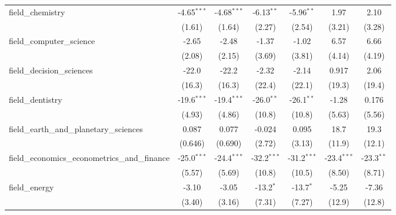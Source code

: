 \begin{tabular}{lcccccc}
   field\_chemistry                                            & -4.65$^{***}$  & -4.68$^{***}$  & -6.13$^{**}$  & -5.96$^{**}$  & 1.97           & 2.10\\   
                                                               & (1.61)         & (1.64)         & (2.27)        & (2.54)        & (3.21)         & (3.28)\\   
   field\_computer\_science                                    & -2.65          & -2.48          & -1.37         & -1.02         & 6.57           & 6.66\\   
                                                               & (2.08)         & (2.15)         & (3.69)        & (3.81)        & (4.14)         & (4.19)\\   
   field\_decision\_sciences                                   & -22.0          & -22.2          & -2.32         & -2.14         & 0.917          & 2.06\\   
                                                               & (16.3)         & (16.3)         & (22.4)        & (22.1)        & (19.3)         & (19.4)\\   
   field\_dentistry                                            & -19.6$^{***}$  & -19.4$^{***}$  & -26.0$^{**}$  & -26.1$^{**}$  & -1.28          & 0.176\\   
                                                               & (4.93)         & (4.86)         & (10.8)        & (10.8)        & (5.63)         & (5.56)\\   
   field\_earth\_and\_planetary\_sciences                      & 0.087          & 0.077          & -0.024        & 0.095         & 18.7           & 19.3\\   
                                                               & (0.646)        & (0.690)        & (2.72)        & (3.13)        & (11.9)         & (12.1)\\   
   field\_economics\_econometrics\_and\_finance                & -25.0$^{***}$  & -24.4$^{***}$  & -32.2$^{***}$ & -31.2$^{***}$ & -23.4$^{***}$  & -23.3$^{**}$\\   
                                                               & (5.57)         & (5.69)         & (10.8)        & (10.5)        & (8.50)         & (8.71)\\   
   field\_energy                                               & -3.10          & -3.05          & -13.2$^{*}$   & -13.7$^{*}$   & -5.25          & -7.36\\   
                                                               & (3.40)         & (3.16)         & (7.31)        & (7.27)        & (12.9)         & (12.8)\\   

\end{tabular}
